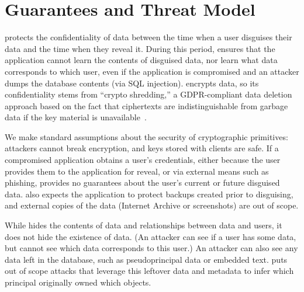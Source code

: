 \section{Guarantees and Threat Model}
\label{s:threat}
%
%
%
\sys protects the confidentiality of \xxed data between the time when a user
disguises their data and the time when they reveal it.
%
%
During this period, \sys ensures that the application cannot learn the contents of
disguised data, nor learn what \xxed data corresponds to which user, even if the
application is compromised and an attacker dumps the database contents (\eg via
SQL injection).
%
\sys encrypts \xxed data, so its confidentiality stems from ``crypto
shredding,'' a GDPR-compliant data deletion approach based on the fact that
ciphertexts are indistinguishable from garbage data if the key material is
unavailable~\cite{dnefs,townsend:cryptoshredding,aws:cryptoshredding,gtr:cryptoshredding}.
%

%
We make standard assumptions about the security of cryptographic primitives:
attackers cannot break encryption, and keys stored with clients are safe.
%
If a compromised application obtains a user's credentials, either because the
user provides them to the application for reveal, or via external means such as
phishing, \sys provides no guarantees about the user's current or future
disguised data.
%
\sys also expects the application to protect backups created prior to
disguising, and external copies of the data (\eg Internet Archive or
screenshots) are out of scope.
%

%
While \sys hides the contents of \xxed data and relationships between \xxed data
and users, it does not hide the existence of
\xxed data. (An attacker can see if
a user has \xxed some data, but cannot see which \xxed data corresponds to this
user.)
%
An attacker can also see any data left in the database, such as pseudoprincipal
data or embedded text.
%
\sys puts out of scope attacks that leverage this leftover data
and metadata to infer which principal originally owned which objects.
%

